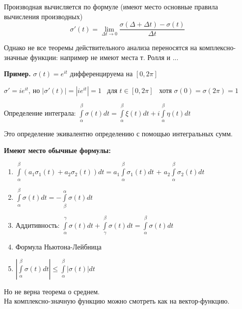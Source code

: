 \documentclass[a4paper, 12pt]{report}
\begin{document}
Производная вычисляется по формуле (имеют место основные правила вычисления производных)
\begin{equation}
 \sigma'(t) = \lim\limits_{\Delta t \to 0} \frac{\sigma(\Delta + \Delta t) - \sigma (t)} {\Delta t}
\end{equation}
\par Однако не все теоремы действительного анализа  переносятся на комплексно-значные функции: например не имеют места т. Ролля и ... 
\par\bigskip
\textbf{Пример.} \quad $\sigma(t) = e^{it}$ дифференцируема на $ [0, 2\pi]$
\par $\sigma' = ie^{it}$, но $|\sigma '(t)| = |ie^{it}| = 1$ \ для $t \in [0, 2\pi]$ \ хотя $\sigma (0) = \sigma (2\pi) = 1$
\par\bigskip
Определение интеграла: $\int\limits_\alpha^\beta \sigma(t)dt = \int\limits_\alpha^\beta \xi(t)dt + i\int\limits_\alpha^\beta \eta(t)dt $  
\par
Это определение экивалентно определению с помощью интегральных сумм.
\par\bigskip
\textbf{Имеют место обычные формулы:}
\begin{enumerate} 
  \item  $\int\limits_\alpha^\beta (a_1\sigma_1(t) + a_2\sigma_2(t))dt =a_1\int\limits_\alpha^\beta \sigma_1(t)dt$ + $a_2\int\limits_\alpha^\beta \sigma_2(t)dt$
  \item  $\int\limits_\alpha^\beta \sigma(t)dt = - \int\limits_\beta^\alpha \sigma(t)dt $
  \item Аддитивность: $\int\limits_\alpha^\gamma \sigma(t)dt +   \int\limits_\gamma^\beta \sigma(t)dt = \int\limits_\alpha^\beta \sigma(t)dt$
  \item Формула Ньютона-Лейбница
  \item $|\int\limits_\alpha^\beta \sigma(t)dt| \leq \int\limits_\alpha^\beta |\sigma(t)|dt$
\end{enumerate}
Но не верна теорема о среднем.
\\На комплексно-значную функцию можно смотреть как на вектор-функцию.
\par\bigskip
\end{document}
